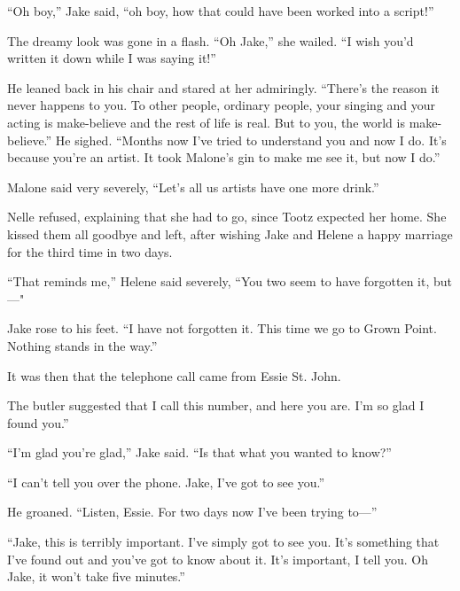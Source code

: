 \documentclass{novel}
\begin{document}
“Oh boy,” Jake said, “oh boy, how that could have been worked into a script!”

The dreamy look was gone in a flash. “Oh Jake,” she wailed. “I wish you’d written it down while I was saying it!”

He leaned back in his chair and stared at her admiringly. “There’s the reason it never happens to you. To other people, ordinary people, your singing and your acting is make-believe and the rest of life is real. But to you, the world is make-believe.” He sighed. “Months now I've tried to understand you and now I do. It’s because you’re an artist. It took Malone’s gin to make me see it, but now I do.”

Malone said very severely, “Let’s all us artists have one more drink.”

Nelle refused, explaining that she had to go, since Tootz expected her home. She kissed them all goodbye and left, after wishing Jake and Helene a happy marriage for the third time in two days.

“That reminds me,” Helene said severely, “You two seem to have forgotten it, but—"

Jake rose to his feet. “I have not forgotten it. This time we go to Grown Point. Nothing stands in the way.”

It was then that the telephone call came from Essie St. John.

\vspace{2\nbs}
\clearpage
\thispagestyle{empty}

\begin{ChapterStart}
\vspace{3\nbs}
\end{ChapterStart}

The butler suggested that I call this number, and here you are. I’m so glad I found you.”

“I'm glad you’re glad,” Jake said. “Is that what you wanted to know?”

“I can’t tell you over the phone. Jake, I’ve got to see you.”

He groaned. “Listen, Essie. For two days now I've been trying to—”

“Jake, this is terribly important. I’ve simply got to see you. It’s something that I’ve found out and you’ve got to know about it. It’s important, I tell you. Oh Jake, it won’t take five minutes.”
\end{document}
